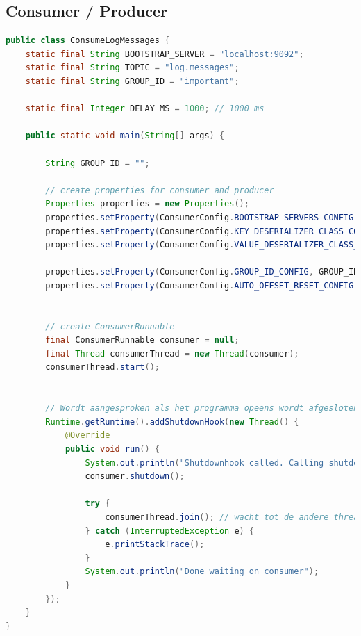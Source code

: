 \documentclass[a4paper,10pt,twoside]{report}
\begin{document}
\subsection{Consumer / Producer}
\begin{lstlisting}[language=Java]
public class ConsumeLogMessages {
	static final String BOOTSTRAP_SERVER = "localhost:9092";
	static final String TOPIC = "log.messages";
	static final String GROUP_ID = "important";
	
	static final Integer DELAY_MS = 1000; // 1000 ms
	
	public static void main(String[] args) {
		
		String GROUP_ID = ""; 
		
		// create properties for consumer and producer
		Properties properties = new Properties();
		properties.setProperty(ConsumerConfig.BOOTSTRAP_SERVERS_CONFIG, BOOTSTRAP_SERVER);
		properties.setProperty(ConsumerConfig.KEY_DESERIALIZER_CLASS_CONFIG, StringDeserializer.class.getName());
		properties.setProperty(ConsumerConfig.VALUE_DESERIALIZER_CLASS_CONFIG, StringDeserializer.class.getName());
		
		properties.setProperty(ConsumerConfig.GROUP_ID_CONFIG, GROUP_ID);
		properties.setProperty(ConsumerConfig.AUTO_OFFSET_RESET_CONFIG, "latest");
		
		
		// create ConsumerRunnable
		final ConsumerRunnable consumer = null;
		final Thread consumerThread = new Thread(consumer);
		consumerThread.start();
		
		
		// Wordt aangesproken als het programma opeens wordt afgesloten.
		Runtime.getRuntime().addShutdownHook(new Thread() {
			@Override
			public void run() {
				System.out.println("Shutdownhook called. Calling shutdown");
				consumer.shutdown();
				
				try {
					consumerThread.join(); // wacht tot de andere thread klaar is
				} catch (InterruptedException e) {
					e.printStackTrace();
				}
				System.out.println("Done waiting on consumer");
			}
		});
	}
}
\end{lstlisting}
\newpage
\end{document}
